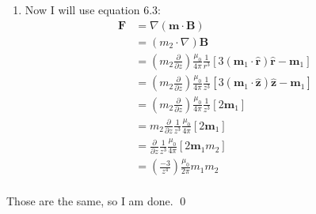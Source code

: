 \documentclass{homework}
\newcommand{\bs}[1]{\ensuremath{\boldsymbol{#1}}}
\newcommand{\bhat}[1]{\ensuremath{\boldsymbol{\hat{#1}}}}
\newcommand{\fracpd}[2]{
    \ensuremath{\frac{\partial #1}{\partial #2}}
  }
\newcommand{\pfrac}[2]{
    \ensuremath{ \left( \frac{#1}{#2} \right)}
  }
\begin{document}
\begin{homeworkProblem}[Problem 6.3]
{\begin{enumerate}
        \begin{align*}
          F &= 2 \pi I R \frac{\mu_0}{4 \pi} \frac{1}{r^3} 3 m_1 \sin \phi \cos \phi \\
            &= 2 \pi I R \frac{\mu_0}{4 \pi} \frac{1}{r^3} 3 m_1 \pfrac{R}{r} \phi \cos \phi \\
            &= 2 \pi I R \frac{\mu_0}{4 \pi} \frac{1}{r^3} 3 m_1 \pfrac{R}{r}  \pfrac{\sqrt{r^2 - R^2}}{r} \\
            &= 2 \pi I R^2 \frac{\mu_0}{4 \pi} \frac{1}{r^5} 3 m_1 \sqrt{r^2 - R^2} \\
            &= m_2 \frac{\mu_0}{2 \pi} \frac{1}{r^5} 3 m_1 \sqrt{r^2 - R^2} \\
            &= \frac{\mu_0}{2 \pi} \frac{1}{r^4} 3 m_1 m_2 \\
        \end{align*}
      \item Now I will use equation 6.3:
      \begin{align*}
        \bs{F} &= \nabla(\bs{m} \cdot \bs{B}) \\
          &= (m_2 \cdot \nabla) \bs{B} \\
          &= \left(m_2 \fracpd{}{z} \right) \frac{\mu_0}{4 \pi} \frac{1}{r^3} \left[ 3(\bs{m}_1 \cdot \bhat{r}) \bhat{r}  - \bs{m}_1\right] \\
          &= \left(m_2 \fracpd{}{z} \right) \frac{\mu_0}{4 \pi} \frac{1}{z^3} \left[ 3(\bs{m}_1 \cdot \bhat{z}) \bhat{z}  - \bs{m}_1\right] \\
          &= \left(m_2 \fracpd{}{z} \right) \frac{\mu_0}{4 \pi} \frac{1}{z^3} \left[ 2 \bs{m}_1 \right] \\
          &=  m_2 \fracpd{}{z} \frac{1}{z^3} \frac{\mu_0}{4 \pi} \left[ 2 \bs{m}_1 \right] \\
          &=  \fracpd{}{z} \frac{1}{z^3} \frac{\mu_0}{4 \pi} \left[ 2 \bs{m}_1 m_2 \right] \\
          &= \pfrac{-3}{z^4} \frac{\mu_0}{2 \pi}  m_1 m_2 \\
      \end{align*}
    \end{enumerate}
    Those are the same, so I am done. \qed
  }
\end{homeworkProblem}
\end{document}
